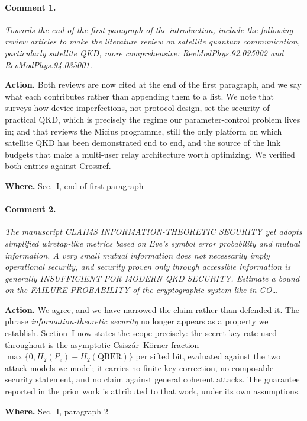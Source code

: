 \documentclass[10pt]{article}
\newcommand{\rev}[1]{\par\medskip\noindent\textit{#1}\par\smallskip}
\newcommand{\act}[2]{\noindent\textbf{Action.} #1\par\noindent\textbf{Where.} #2\par}
\begin{document}
\paragraph{Comment 1.}
\rev{Towards the end of the first paragraph of the introduction, include the following review articles to make the literature review on satellite quantum communication, particularly satellite QKD, more comprehensive: RevModPhys.92.025002 and RevModPhys.94.035001.}
\act{Both reviews are now cited at the end of the first paragraph, and we say what each contributes rather than appending them to a list. We note that \cite{xu2020rmp} surveys how device imperfections, not protocol design, set the security of practical QKD, which is precisely the regime our parameter-control problem lives in; and that \cite{lu2022micius} reviews the Micius programme, still the only platform on which satellite QKD has been demonstrated end to end, and the source of the link budgets that make a multi-user relay architecture worth optimizing. We verified both entries against Crossref.}{Sec.~I, end of first paragraph}

\paragraph{Comment 2.}
\rev{The manuscript CLAIMS INFORMATION-THEORETIC SECURITY yet adopts simplified wiretap-like metrics based on Eve's symbol error probability and mutual information. A very small mutual information does not necessarily imply operational security, and security proven only through accessible information is generally INSUFFICIENT FOR MODERN QKD SECURITY. Estimate a bound on the FAILURE PROBABILITY of the cryptographic system like in CO\dots}
\act{We agree, and we have narrowed the claim rather than defended it. The phrase \emph{information-theoretic security} no longer appears as a property we establish. Section~I now states the scope precisely: the secret-key rate used throughout is the asymptotic Csisz\'ar--K\"orner fraction $\max\{0, H_2(P_e)-H_2(\mathrm{QBER})\}$ per sifted bit, evaluated against the two attack models we model; it carries no finite-key correction, no composable-security statement, and no claim against general coherent attacks. The guarantee reported in the prior work is attributed to that work, under its own assumptions.}{Sec.~I, paragraph 2}
\end{document}
